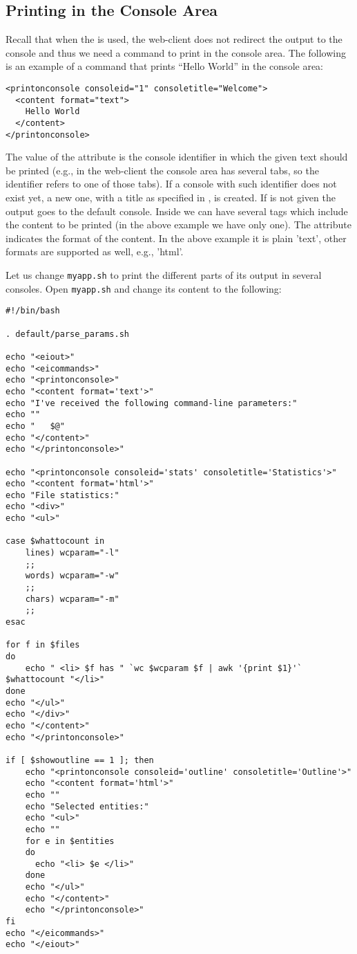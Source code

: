 \subsection{Printing in the Console Area}

Recall that when the \eiol is used, the web-client does not redirect
the output to the console and thus we need a command to
print in the console area.
%
The following is an example of a command that prints ``Hello World''
in the console area:

\medskip
\begin{lstlisting}
<printonconsole consoleid="1" consoletitle="Welcome">
  <content format="text">
    Hello World
  </content>
</printonconsole>
\end{lstlisting}

\medskip
\noindent
The value of the  attribute is the console identifier
in which the given text should be printed (e.g., in the web-client the
console area has several tabs, so the identifier refers to one of
those tabs). If a console with such identifier does not exist yet, a
new one, with a title as specified in , is
created. If  is not given the output goes to the
default console.
%
Inside  we can have several  tags
which include the content to be printed (in the above example we have
only one). The attribute  indicates the format of the
content. In the above example it is plain 'text', other formats are
supported as well, e.g., 'html'.
%

Let us change \texttt{myapp.sh} to print the different parts of its
output in several consoles. Open \texttt{myapp.sh} and change its
content to the following:


\medskip
\begin{lstlisting}[style=script]
#!/bin/bash

. default/parse_params.sh

echo "<eiout>"
echo "<eicommands>"
echo "<printonconsole>"
echo "<content format='text'>"
echo "I've received the following command-line parameters:"
echo ""
echo "   $@"
echo "</content>"
echo "</printonconsole>"

echo "<printonconsole consoleid='stats' consoletitle='Statistics'>"
echo "<content format='html'>"
echo "File statistics:"
echo "<div>"
echo "<ul>"

case $whattocount in
    lines) wcparam="-l"
    ;;
    words) wcparam="-w"
    ;;
    chars) wcparam="-m"
    ;;
esac

for f in $files 
do
    echo " <li> $f has " `wc $wcparam $f | awk '{print $1}'` $whattocount "</li>"
done
echo "</ul>"
echo "</div>"
echo "</content>"
echo "</printonconsole>"

if [ $showoutline == 1 ]; then
    echo "<printonconsole consoleid='outline' consoletitle='Outline'>"
    echo "<content format='html'>"
    echo ""
    echo "Selected entities:"
    echo "<ul>"
    echo ""
    for e in $entities 
    do
      echo "<li> $e </li>"
    done
    echo "</ul>"
    echo "</content>"
    echo "</printonconsole>"
fi
echo "</eicommands>"
echo "</eiout>"
\end{lstlisting}

